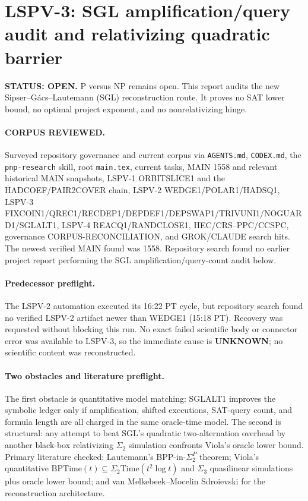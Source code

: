 \documentclass[11pt]{article}
\begin{document}
\section*{LSPV-3: SGL amplification/query audit and relativizing quadratic barrier}
\textbf{STATUS: OPEN.} P versus NP remains open. This report audits the new Sipser--G\'acs--Lautemann (SGL) reconstruction route. It proves no SAT lower bound, no optimal project exponent, and no nonrelativizing hinge.

\paragraph{CORPUS REVIEWED.}
Surveyed repository governance and current corpus via \texttt{AGENTS.md}, \texttt{CODEX.md}, the \texttt{pnp-research} skill, root \texttt{main.tex}, current tasks, MAIN 1558 and relevant historical MAIN snapshots, LSPV-1 ORBITSLICE1 and the HADCOEF/PAIR2COVER chain, LSPV-2 WEDGE1/POLAR1/HADSQ1, LSPV-3 FIXCOIN1/QREC1/RECDEP1/DEPDEF1/DEPSWAP1/TRIVUNI1/NOGUARD1/SGLALT1, LSPV-4 REACQ1/RANDCLOSE1, HEC/CRS--PPC/CCSPC, governance CORPUS-RECONCILIATION, and GROK/CLAUDE search hits. The newest verified MAIN found was 1558. Repository search found no earlier project report performing the SGL amplification/query-count audit below.

\paragraph{Predecessor preflight.}
The LSPV-2 automation executed its 16:22 PT cycle, but repository search found no verified LSPV-2 artifact newer than WEDGE1 (15:18 PT). Recovery was requested without blocking this run. No exact failed scientific body or connector error was available to LSPV-3, so the immediate cause is \textbf{UNKNOWN}; no scientific content was reconstructed.

\paragraph{Two obstacles and literature preflight.}
The first obstacle is quantitative model matching: SGLALT1 improves the symbolic ledger only if amplification, shifted executions, SAT-query count, and formula length are all charged in the same oracle-time model. The second is structural: any attempt to beat SGL's quadratic two-alternation overhead by another black-box relativizing $\Sigma_2$ simulation confronts Viola's oracle lower bound. Primary literature checked: Lautemann's BPP-in-$\Sigma_2^P$ theorem; Viola's quantitative $\mathrm{BPTime}(t)\subseteq\Sigma_2\mathrm{Time}(t^2\log t)$ and $\Sigma_3$ quasilinear simulations plus oracle lower bound; and van Melkebeek--Mocelin Sdroievski for the reconstruction architecture.
\end{document}
